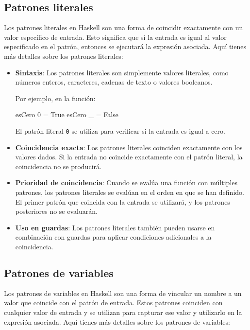 \documentclass{article}
\begin{document}
\subsection{Patrones literales}
Los patrones literales en Haskell son una forma de coincidir exactamente con un valor específico de entrada. Esto significa que si la entrada es igual al valor especificado en el patrón, entonces se ejecutará la expresión asociada. Aquí tienes más detalles sobre los patrones literales:

\begin{itemize}
    \item \textbf{Sintaxis}: Los patrones literales son simplemente valores literales, como números enteros, caracteres, cadenas de texto o valores booleanos.
    
    Por ejemplo, en la función:
    \begin{haskell}
    esCero 0 = True
    esCero _ = False
    \end{haskell}
    El patrón literal \texttt{0} se utiliza para verificar si la entrada es igual a cero.
    
    \item \textbf{Coincidencia exacta}: Los patrones literales coinciden exactamente con los valores dados. Si la entrada no coincide exactamente con el patrón literal, la coincidencia no se producirá.
    
    \item \textbf{Prioridad de coincidencia}: Cuando se evalúa una función con múltiples patrones, los patrones literales se evalúan en el orden en que se han definido. El primer patrón que coincida con la entrada se utilizará, y los patrones posteriores no se evaluarán.
    
    \item \textbf{Uso en guardas}: Los patrones literales también pueden usarse en combinación con guardas para aplicar condiciones adicionales a la coincidencia.
\end{itemize}

\subsection{Patrones de variables}
Los patrones de variables en Haskell son una forma de vincular un nombre a un valor que coincide con el patrón de entrada. Estos patrones coinciden con cualquier valor de entrada y se utilizan para capturar ese valor y utilizarlo en la expresión asociada. Aquí tienes más detalles sobre los patrones de variables:
\end{document}
